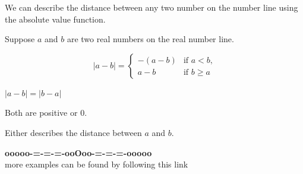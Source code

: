 \documentclass{ximera}
\begin{document}
We can describe the distance between any two number on the number line using the absolute value function.

Suppose $a$ and $b$ are two real numbers on the real number line.





\[
|a-b| = 
\begin{cases}
  -(a-b) & \text{if $a<b$,}  \\
  a-b & \text{if $b\ge a$}
\end{cases}
\]



$|a-b| = |b-a|$

Both are positive or $0$.

Either describes the distance between $a$ and $b$.






















\begin{onlineOnly}
\begin{center}
\textbf{\textcolor{green!50!black}{ooooo-=-=-=-ooOoo-=-=-=-ooooo}} \\

more examples can be found by following this link\\ 

\end{center}
\end{onlineOnly}
\end{document}
